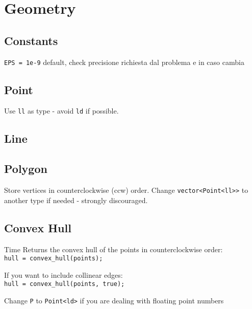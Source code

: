 \section{Geometry}

\subsection{Constants}
\verb|EPS = 1e-9| default, check precisione richiesta dal problema e in caso cambia



\subsection{Point}
Use \verb|ll| as type - avoid \verb|ld| if possible.


\subsection{Line}


\subsection{Polygon}
Store vertices in counterclockwise (ccw) order.
Change \verb|vector<Point<ll>>| to another type if needed - strongly discouraged.



\subsection{Convex Hull}
 Time
Returns the convex hull of the points in counterclockwise order: \\
\verb|hull = convex_hull(points);|

If you want to include collinear edges: \\
\verb|hull = convex_hull(points, true);|

Change \verb|P| to \verb|Point<ld>| if you are dealing with floating point numbers

